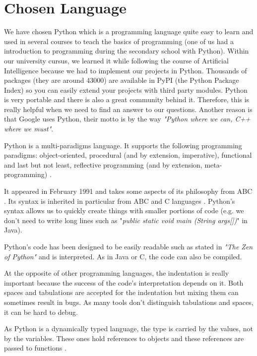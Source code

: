 \section{Chosen Language}
We have chosen Python which is a programming language quite easy to learn and used in several courses to teach the basics of programming (one of us had a introduction to programming during the secondary school with Python). Within our university cursus, we learned it while following the course of Artificial Intelligence because we had to implement our projects in Python. Thousands of packages (they are around 43000) are available in PyPI (the Python Package Index) so you can easily extend your projects with third party modules. Python is very portable and there is also a great community behind it. Therefore, this is really helpful when we need to find an answer to our questions. Another reason is that Google uses Python, their motto is by the way \textit{"Python where we can, C++ where we must"}.
\newline

Python is a multi-paradigms language. It supports the following programming paradigms: object-oriented, procedural (and by extension, imperative), functional and last but not least, reflective programming (and by extension, meta-programming) \cite{martelli2006python, python_doc_functional}.

It appeared in February 1991 and takes some aspects of its philosophy from ABC \cite{python_doc_why}. Its syntax is inherited in particular from ABC and C languages \cite{wikipediaEN_history_python}. Python's syntax allows us to quickly create things with smaller portions of code (e.g. we don't need to write long lines such as "\textit{public static void main (String args[])}" in Java).

Python's code has been designed to be easily readable such as stated in \textit{"The Zen of Python"} \cite{python_pep0020} and is interpreted. As in Java or C, the code can also be compiled.

At the opposite of other programming languages, the indentation is really important because the success of the code's interpretation depends on it. Both spaces and tabulations are accepted for the indentation but mixing them can sometimes result in bugs. As many tools don't distinguish tabulations and spaces, it can be hard to debug.

As Python is a dynamically typed language, the type is carried by the values, not by the variables. These ones hold references to objects and these references are passed to functions \cite{wikipediaEN_python_syntax_semantics}.

